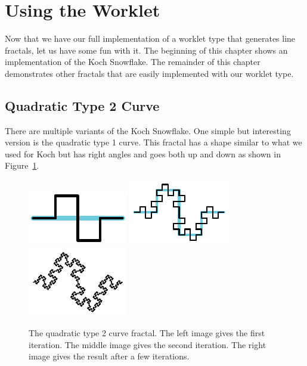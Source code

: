 

\section{Using the Worklet}
\label{sec:NewWorkletTypes:Using}

Now that we have our full implementation of a worklet type that generates line fractals, let us have some fun with it.
The beginning of this chapter shows an implementation of the Koch Snowflake.
The remainder of this chapter demonstrates other fractals that are easily implemented with our worklet type.

\subsection{Quadratic Type 2 Curve}

There are multiple variants of the Koch Snowflake.
One simple but interesting version is the quadratic type 1 curve.
This fractal has a shape similar to what we used for Koch but has right angles and goes both up and down as shown in Figure~\ref{fig:QuadraticType2}.

\begin{figure}[htb]
  \centering
  \includegraphics[scale=2]{images/QuadraticType2_1}
  \hfill
  \includegraphics[scale=2]{images/QuadraticType2_2}
  \hfill
  \includegraphics[scale=2]{images/QuadraticType2_4}
  \caption[The quadratic type 2 curve fractal.]{
    The quadratic type 2 curve fractal.
    The left image gives the first iteration.
    The middle image gives the second iteration.
    The right image gives the result after a few iterations.
  }
  \label{fig:QuadraticType2}
\end{figure}


